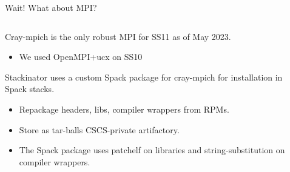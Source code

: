 \documentclass[aspectratio=43]{beamer}
\begin{document}
\begin{frame}[fragile]{Wait! What about MPI?}
    \begin{columns}[T]
        \begin{column}{0.65\textwidth}
            Cray-mpich is the only robust MPI for SS11 as of May 2023.
            \begin{itemize}
                \item We used OpenMPI+ucx on SS10
            \end{itemize}

            \vspace{10pt}

            Stackinator uses a custom Spack package for cray-mpich for installation in Spack stacks.
            \begin{itemize}
                \item Repackage headers, libs, compiler wrappers from RPMs.
                \item Store as tar-balls CSCS-private artifactory.
                \item The Spack package uses patchelf on libraries and string-substitution on compiler wrappers.
            \end{itemize}
        \end{column}
        \hspace{-40pt}
        \begin{column}{0.4\textwidth}
            {
            \setlength{\DTbaselineskip}{5pt}
            \footnotesize
            
            }
        \end{column}
    \end{columns}
\end{frame}
\end{document}

